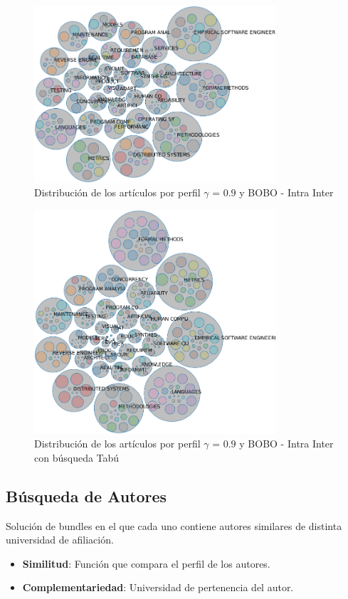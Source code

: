 \begin{figure}[H]
  \centering
    \includegraphics[width=0.8\textwidth]{resultados/papers/BOBO/INTRA_INTER/bubbles-gamma-09.png}
  \caption{Distribución de los artículos por perfil $\gamma$ = $0.9$ y BOBO - Intra Inter}
  \label{res:img-papers-bubbles-gamma09-bobo-intra-inter}
\end{figure}

\begin{figure}[H]
  \centering
    \includegraphics[width=0.8\textwidth]{resultados/papers/BOBO/INTRA_INTER/bubbles-gamma-with-local-09.png}
  \caption{Distribución de los artículos por perfil $\gamma$ = $0.9$ y BOBO - Intra Inter con búsqueda Tabú}
  \label{res:img-papers-bubbles-gamma09-hac-intra-inter-bobo}
\end{figure}
\newpage
\subsection{Búsqueda de Autores}
Solución de bundles en el que cada uno contiene autores similares de distinta universidad de afiliación.\\
\begin{itemize}
  \item \textbf{Similitud}: Función que compara el perfil de los autores.
  \item \textbf{Complementariedad}: Universidad de pertenencia del autor.
\end{itemize}

